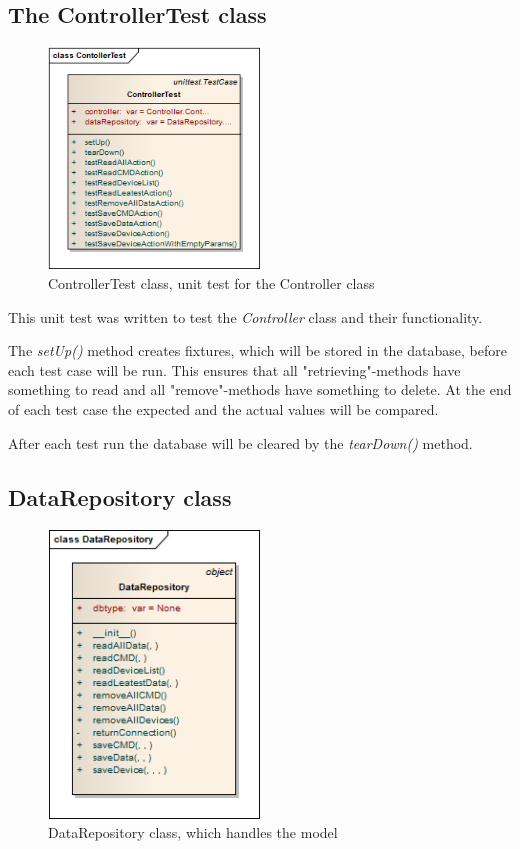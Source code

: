 \subsection{The ControllerTest class}
\begin{figure}[H]
   \centering
   \includegraphics[width=0.5\textwidth]{pic/ControllerTest.png}%
   \caption{ControllerTest class, unit test for the Controller class}
   \label{ControllerTestpic}%
\end{figure}

This unit test was written to test the \textit{Controller} class and their functionality. 

The \textit{setUp()} method creates fixtures, which will be stored in the database, before each test case will be run. This ensures that all "retrieving"-methods have something to read and all "remove"-methods have something to delete. At the end of each test case the expected and the actual values will be compared. 

After each test run the database will be cleared by the \textit{tearDown()} method. 

\newpage
\subsection{DataRepository class}
\begin{figure}[H]
   \centering
   \includegraphics[width=0.5\textwidth]{pic/DataRepository.png}%
   \caption{DataRepository class, which handles the model}
   \label{DataRepositorypic}%
\end{figure}

